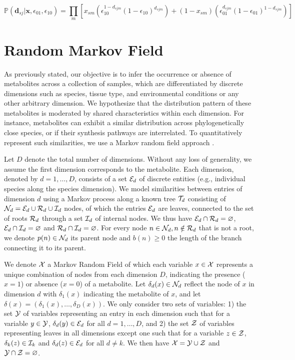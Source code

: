 \documentclass[
11pt, %
oneside, %
english, %
singlespacing, %
headsepline, %
chapterinoneline, %
]{MastersDoctoralThesis} %
\def\P{\mathbb{P}}
\def\E{\mathbb{E}}
\def\x{\boldsymbol{x}}
\def\bd{\boldsymbol{d}}
\def\E{{\cal E}}
\def\I{{\cal I}}
\def\N{{\cal N}}
\def\R{{\cal R}}
\def\T{{\cal T}}
\def\X{{\cal X}}
\def\Y{{\cal Y}}
\def\Z{{\cal Z}}
\begin{document}
	\begin{equation}\label{eq:mass spec error rate}
		\P(\bd_{sj}|\x, \epsilon_{01}, \epsilon_{10}) = \prod_m \left[ x_{sm}\left(\epsilon_{10}^{1-d_{sjm}}(1-\epsilon_{10})^{d_{sjm}}\right) + (1-x_{sm})\left( \epsilon_{01}^{d_{sjm}}(1-\epsilon_{01})^{1-d_{sjm}}\right)\right]
	\end{equation}

	

\section{Random Markov Field}\label{sec:methods:random markov field}

As previously stated, our objective is to infer the occurrence or absence of metabolites across a collection of samples, which are differentiated by discrete dimensions such as species, tissue type, and environmental conditions or any other arbitrary dimension. We hypothesize that the distribution pattern of these metabolites is moderated by shared characteristics within each dimension. For instance, metabolites can exhibit a similar distribution across phylogenetically close species, or if their synthesis pathways are interrelated. To quantitatively represent such similarities, we use a Markov random field approach \cite{sherringtonSolvableModelSpinGlass1975, kindermannMarkovRandomFields1980}.

Let $D$ denote the total number of dimensions. Without any loss of generality, we assume the first dimension corresponds to the metabolite. Each dimension, denoted by $d=1, \ldots, D$, consists of a set $\E_d$ of discrete entities (e.g., individual species along the species dimension). We model similarities between entries of dimension $d$ using a Markov process along a known tree $\T_d$ consisting of $\N_d = \E_d \cup \R_d \cup \I_d$ nodes, of which the entries $\E_d$ are leaves, connected to the set of roots $\R_d$ through a set $\I_d$ of internal nodes. We thus have $\E_d \cap \R_d = \varnothing$, $\E_d \cap \I_d = \varnothing$ and $\R_d \cap \I_d = \varnothing$. For every node $n \in \N_d, n \notin \R_d$ that is not a root, we denote $p(n) \in \N_d$ its parent node and $b(n) \geq 0$ the length of the branch connecting it to its parent.

We denote $\X$ a Markov Random Field of which each variable $x \in \X$ represents a unique combination of nodes from each dimension $D$, indicating the presence ($x=1$) or absence ($x=0$) of a metabolite. Let $\delta_d(x) \in \N_d$ reflect the node of $x$ in dimension $d$ with $\delta_1(x)$ indicating the metabolite of $x$, and let $\delta(x)=(\delta_1(x), \ldots, \delta_D(x))$. We only consider two sets of variables: 1) the set $\Y$ of variables representing an entry in each dimension such that for a variable $y\in\Y$, $\delta_d(y) \in \E_d$ for all $d=1, \ldots, D$, and 2) the set $\Z$ of variables representing leaves in all dimensions except one such that for a variable $z \in \Z$, $\delta_k(z) \in \I_k$ and $\delta_d(z) \in \E_d$ for all $d \neq k$. We then have $\X = \Y \cup \Z$ and $\Y \cap \Z = \varnothing$.
\end{document}
